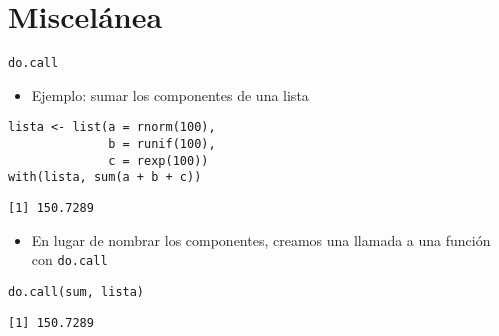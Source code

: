 \documentclass[xcolor={usenames,svgnames,dvipsnames}]{beamer}
\begin{document}
\section{Miscelánea}
\label{sec:orgd2bcd9b}
\begin{frame}[fragile,label={sec:orgb9ab77a}]{\texttt{do.call}}
 \begin{itemize}
\item Ejemplo: sumar los componentes de una lista
\end{itemize}
\lstset{language=r,label= ,caption= ,captionpos=b,numbers=none}
\begin{lstlisting}
lista <- list(a = rnorm(100),
              b = runif(100),
              c = rexp(100))
with(lista, sum(a + b + c))
\end{lstlisting}

\begin{verbatim}
[1] 150.7289
\end{verbatim}

\begin{itemize}
\item En lugar de nombrar los componentes, creamos una llamada a una
función con \texttt{do.call}
\end{itemize}
\lstset{language=r,label= ,caption= ,captionpos=b,numbers=none}
\begin{lstlisting}
do.call(sum, lista)
\end{lstlisting}

\begin{verbatim}
[1] 150.7289
\end{verbatim}
\end{frame}
\end{document}
